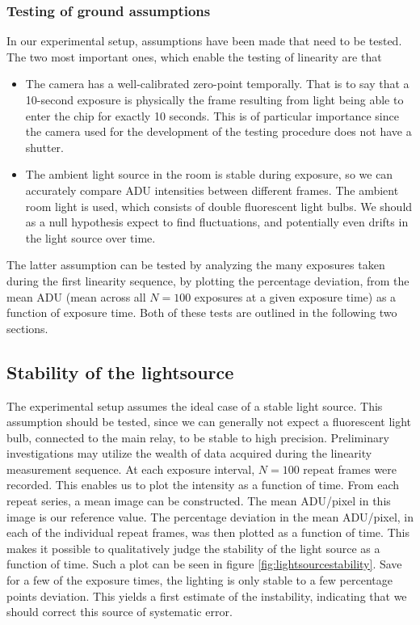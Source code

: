 \documentclass[../main.tex]{subfiles}
\begin{document}
		\subsubsection{Testing of ground assumptions}
		In our experimental setup, assumptions have been made that need to be tested. The two most important ones, which enable the testing of linearity are that 
		\begin{itemize}
			\item The camera has a well-calibrated zero-point temporally. That is to say that a 10-second exposure is physically the frame resulting from light being able to enter the chip for exactly 10 seconds. This is of particular importance since the camera used for the development of the testing procedure does not have a shutter.
			\item The ambient light source in the room is stable during exposure, so we can accurately compare ADU intensities between different frames. The ambient room light is used, which consists of double fluorescent light bulbs. We should as a null hypothesis expect to find fluctuations, and potentially even drifts in the light source over time.
		\end{itemize}
		The latter assumption can be tested by analyzing the many exposures taken during the first linearity sequence, by plotting the percentage deviation, from the mean ADU (mean across all $N=100$ exposures at a given exposure time) as a function of exposure time. Both of these tests are outlined in the following two sections. 
		
		\subsection{Stability of the lightsource}
		The experimental setup assumes the ideal case of a stable light source. This assumption should be tested, since we can generally not expect a fluorescent light bulb, connected to the main relay, to be stable to high precision. Preliminary investigations may utilize the wealth of data acquired during the linearity measurement sequence. At each exposure interval, $N = 100$ repeat frames were recorded. This enables us to plot the intensity as a function of time. From each repeat series, a mean image can be constructed. The mean ADU/pixel in this image is our reference value. The percentage deviation in the mean ADU/pixel, in each of the individual repeat frames, was then plotted as a function of time. This makes it possible to qualitatively judge the stability of the light source as a function of time. Such a plot can be seen in figure \ref{fig:lightsourcestability}. Save for a few of the exposure times, the lighting is only stable to a few percentage points deviation. This yields a first estimate of the instability, indicating that we should correct this source of systematic error. 
		
\end{document}
